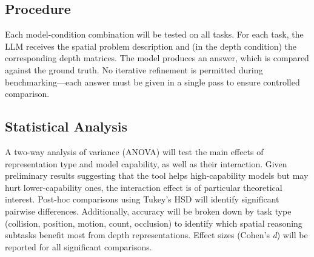 \documentclass[stu,12pt,a4paper,floatsintext]{apa7}
\begin{document}
\subsection*{Procedure}

Each model-condition combination will be tested on all tasks. For each task, the LLM receives the spatial problem description and (in the depth condition) the corresponding depth matrices. The model produces an answer, which is compared against the ground truth. No iterative refinement is permitted during benchmarking---each answer must be given in a single pass to ensure controlled comparison.

\subsection*{Statistical Analysis}

A two-way analysis of variance (ANOVA) will test the main effects of representation type and model capability, as well as their interaction. Given preliminary results suggesting that the tool helps high-capability models but may hurt lower-capability ones, the interaction effect is of particular theoretical interest. Post-hoc comparisons using Tukey's HSD will identify significant pairwise differences. Additionally, accuracy will be broken down by task type (collision, position, motion, count, occlusion) to identify which spatial reasoning subtasks benefit most from depth representations. Effect sizes (Cohen's \emph{d}) will be reported for all significant comparisons.
\end{document}
